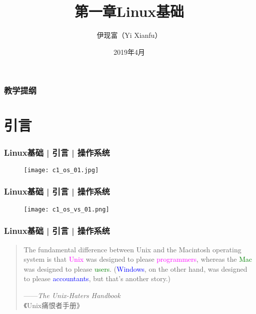 



\title[Linux基础]{第一章\quad Linux基础}
\author[Yixf]{伊现富（Yi Xianfu）}
\date{2019年4月}

%

\begin{frame}
  \titlepage
\end{frame}

\begin{frame}[plain]
  \frametitle{教学提纲}
  \setcounter{tocdepth}{3}
  \begin{multicols}{2}
    \tableofcontents
  \end{multicols}
\end{frame}

\section{引言}
\begin{frame}
  \frametitle{Linux基础 | 引言 | 操作系统}
  \begin{figure}
    \centering
    \texttt{[image: c1\_os\_01.jpg]}
  \end{figure}
\end{frame}

\begin{frame}
  \frametitle{Linux基础 | 引言 | 操作系统}
  \begin{figure}
    \centering
    \texttt{[image: c1\_os\_vs\_01.png]}
  \end{figure}
\end{frame}

\begin{frame}
  \frametitle{Linux基础 | 引言 | 操作系统}
  \begin{quotation}
    The fundamental difference between Unix and the Macintosh operating system is that \textcolor{magenta}{Unix} was designed to please \textcolor{magenta}{programmers}, whereas the \textcolor{green}{Mac} was designed to please \textcolor{green}{users}. (\textcolor{blue}{Windows}, on the other hand, was designed to please \textcolor{blue}{accountants}, but that's another story.)
    \begin{flushright}
      ——\textit{The Unix-Haters Handbook}\\《Unix痛恨者手册》
    \end{flushright}
  \end{quotation}
\end{frame}

